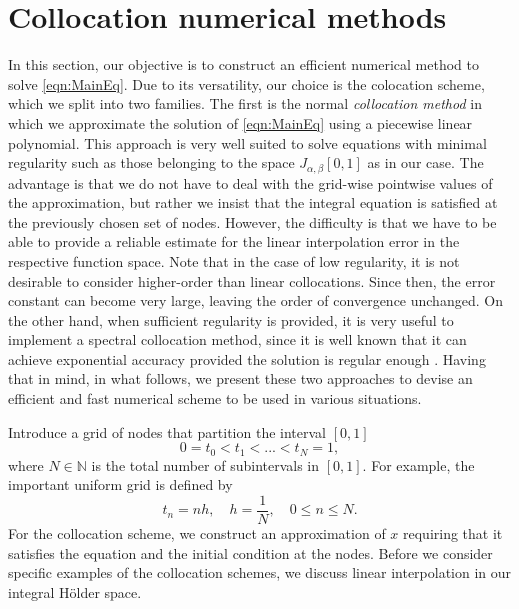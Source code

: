 \documentclass[12pt,a4paper]{article}
\begin{document}
\section{Collocation numerical methods}
In this section, our objective is to construct an efficient numerical method to solve \eqref{eqn:MainEq}. Due to its versatility, our choice is the colocation scheme, which we split into two families. The first is the normal \textit{collocation method} in which we approximate the solution of \eqref{eqn:MainEq} using a piecewise linear polynomial. This approach is very well suited to solve equations with minimal regularity such as those belonging to the space $J_{\alpha, \beta}[0,1]$ as in our case. The advantage is that we do not have to deal with the grid-wise pointwise values of the approximation, but rather we insist that the integral equation is satisfied at the previously chosen set of nodes. However, the difficulty is that we have to be able to provide a reliable estimate for the linear interpolation error in the respective function space. Note that in the case of low regularity, it is not desirable to consider higher-order than linear collocations. Since then, the error constant can become very large, leaving the order of convergence unchanged. On the other hand, when sufficient regularity is provided, it is very useful to implement a spectral collocation method, since it is well known that it can achieve exponential accuracy provided the solution is regular enough \cite{canuto2006spectral}. Having that in mind, in what follows, we present these two approaches to devise an efficient and fast numerical scheme to be used in various situations.

Introduce a grid of nodes that partition the interval $[0,1]$ 
\begin{equation}\label{eqn:Grid}
	0 = t_0 < t_1 < ... < t_N = 1,
\end{equation}
where $N \in \mathbb{N}$ is the total number of subintervals in $[0,1]$. For example, the important uniform grid is defined by 
\begin{equation}\label{eqn:UniGrid}
	t_n = n h, \quad h = \frac{1}{N}, \quad 0 \leq n \leq N.
\end{equation}
For the collocation scheme, we construct an approximation of $x$ requiring that it satisfies the equation and the initial condition at the nodes. Before we consider specific examples of the collocation schemes, we discuss linear interpolation in our integral H\"older space. 
\end{document}
